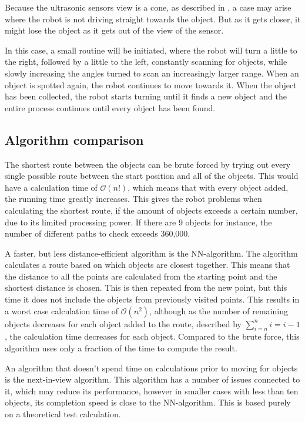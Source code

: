 Because the ultrasonic sensors view is a cone, as described in , a case may arise where the robot is not driving straight towards the object. But as it gets closer, it might lose the object as it gets out of the view of the sensor.

In this case, a small routine will be initiated, where the robot will turn a little to the right, followed by a little to the left, constantly scanning for objects, while slowly increasing the angles turned to scan an increasingly larger range. When an object is spotted again, the robot continues to move towards it. When the object has been collected, the robot starts turning until it finds a new object and the entire process continues until every object has been found.


\subsection{Algorithm comparison} \label{sec:algorithm-desc}

The shortest route between the objects can be brute forced by trying out every single possible route between the start position and all of the objects. This would have a calculation time of $\mathcal{O}(n!)$, which means that with every object added, the running time greatly increases. This gives the robot problems when calculating the shortest route, if the amount of objects exceeds a certain number, due to its limited processing power. If there are 9 objects for instance, the number of different paths to check exceeds 360,000.  

A faster, but less distance-efficient algorithm is the NN-algorithm. The algorithm calculates a route based on which objects are closest together. This means that the distance to all the points are calculated from the starting point and the shortest distance is chosen. This is then repeated from the new point, but this time it does not include the objects from previously visited points. This results in a worst case calculation time of $\mathcal{O}(n^2)$, although as the number of remaining objects decreases for each object added to the route, described by $\sum\limits_{i=n}^n i = i - 1$, the calculation time decreases for each object. Compared to the brute force, this algorithm uses only a fraction of the time to compute the result. 

An algorithm that doesn't spend time on calculations prior to moving for objects is the next-in-view algorithm. This algorithm has a number of issues connected to it, which may reduce its performance, however in smaller cases with less than ten objects, its completion speed is close to the NN-algorithm. This is based purely on a theoretical test calculation.

